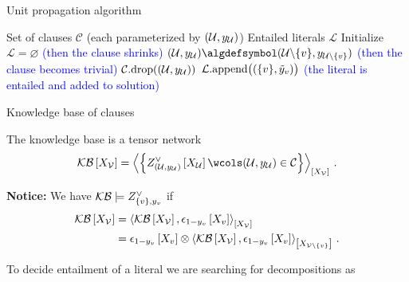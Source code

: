 \documentclass{beamer}
\begin{document}
    \begin{frame}[fragile]{Unit propagation algorithm}
        \begin{algorithm}[H]
            \begin{algorithmic}
                \Require Set of clauses $\mathcal{C}$ (each parameterized by $(\mathcal{U},y_{\mathcal{U}})$)
                \Ensure Entailed literals $\mathcal{L}$
                \iosepline
                \State Initialize $\mathcal{L}=\varnothing$
                        \If{$\headindexof{\node}\neq\secheadindexof{\node}$}
                            \hfill \textcolor{blue}{(then the clause shrinks)}
                            \State $\hardparam\algdefsymbol(\hardlegset\backslash\{\node\},\headindexof{\hardlegset\backslash\{\node\}})$
                        \Else
                            \hfill \textcolor{blue}{(then the clause becomes trivial)}
                            \State $\mathcal{C}.\mathrm{drop(}(\mathcal{U},y_{\mathcal{U}})\mathrm{)}$ %
                        \EndIf
                    \EndFor
                    \State $\mathcal{L}.\mathrm{append\big((}\{v\},\tilde{y}_{v}\mathrm{)\big)}$ \hfill \textcolor{blue}{(the literal is entailed and added to solution)}
                \EndWhile
            \end{algorithmic}
        \end{algorithm}
    \end{frame}

    \begin{frame}{Knowledge base of clauses}

        The knowledge base is a tensor network
        \begin{align*}
            \kbat{\nodevariables}
            = \contractionof{\left\{
                \clauseofat{\hardparam}{\catvariableof{\hardlegset}} \wcols \hardparam \in \mathcal{C}
            \right\}
            }{\nodevariables} \, .
        \end{align*}

            {\bf Notice:} We have $\mathcal{KB}\models Z^{\lor}_{\{v\},y_{v}}$ if
        \begin{align*}
            \mathcal{KB}\left[X_{\mathcal{V}}\right]
            &= \left\langle \mathcal{KB}\left[X_{\mathcal{V}}\right],\epsilon_{1-y_{v}}\left[X_{v}\right]\right\rangle_{\left[ X_{\mathcal{V}} \right]} \\
            &= \epsilon_{1-y_{v}}\left[X_{v}\right]
            \otimes \left\langle \mathcal{KB}\left[X_{\mathcal{V}}\right],\epsilon_{1-y_{v}}\left[X_{v}\right]\right\rangle_{\left[ X_{\mathcal{V}\backslash\{v\}} \right]} \, .
        \end{align*}

        To decide entailment of a literal we are searching for decompositions as
        

    \end{frame}
\end{document}
